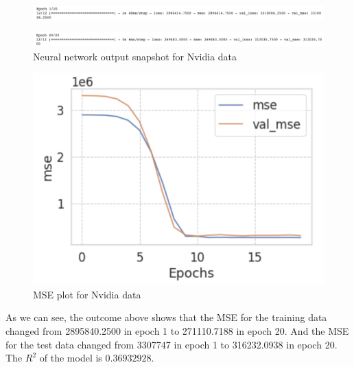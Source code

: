 \documentclass{scrartcl}
\begin{document}
\begin{figure}
         \centering
         \includegraphics[width=\textwidth]{Graphics/Neural Network Images/NN12.png}
\end{figure}
     
\begin{figure}
         \centering
         \includegraphics[width=\textwidth]{Graphics/Neural Network Images/NN13.png}
         \caption{Neural network output snapshot for Nvidia data}
         \label{fig:NN12-13}
\end{figure}

\begin{figure}[H]
	\begin{center}
		\includegraphics[scale=1.0]{Graphics/Neural Network Images/NN11.png}
    \caption{MSE plot for Nvidia data}
	\end{center}
	\label{fig:NN11}
\end{figure}

\noindent As we can see, the outcome above shows that the MSE for the training data changed from 2895840.2500 in epoch 1 to 271110.7188 in epoch 20. And the MSE for the test data changed from 3307747 in epoch 1 to 316232.0938 in epoch 20. The $R^2$ of the model is $0.36932928$.\\




\end{document}
